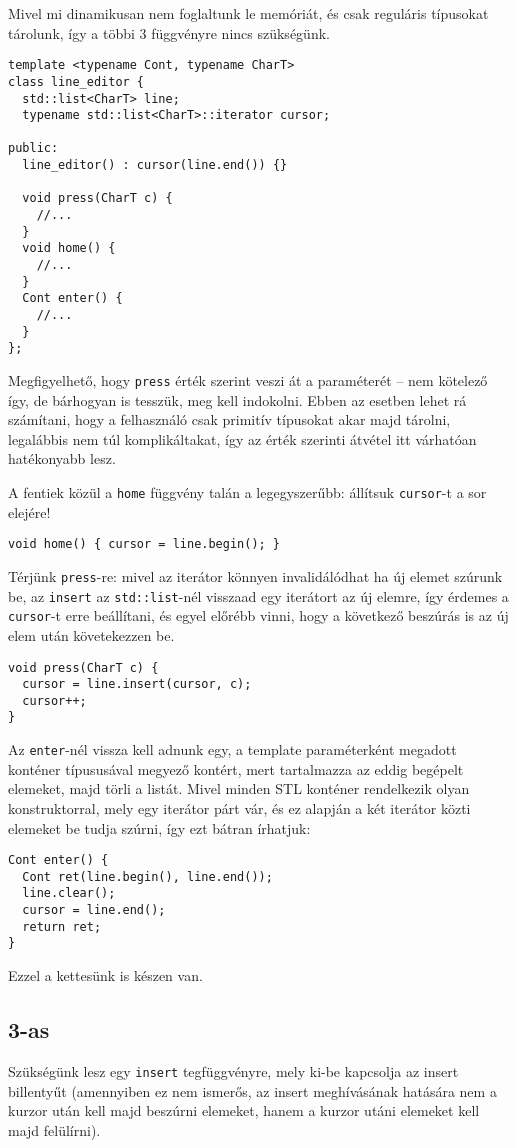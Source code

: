 \documentclass[../cpp_book/cpp_book.tex]{subfiles}
\begin{document}
	Mivel mi dinamikusan nem foglaltunk le memóriát, és csak reguláris típusokat tárolunk, így a többi 3 függvényre nincs szükségünk.
\begin{lstlisting}
template <typename Cont, typename CharT>
class line_editor {
  std::list<CharT> line;
  typename std::list<CharT>::iterator cursor;

public:
  line_editor() : cursor(line.end()) {}

  void press(CharT c) {
    //...
  }
  void home() {
    //...
  }
  Cont enter() {
    //...
  }
};
\end{lstlisting}
	\begin{note}
		Megfigyelhető, hogy \texttt{press} érték szerint veszi át a paraméterét -- nem kötelező így, de bárhogyan is tesszük, meg kell indokolni. Ebben az esetben lehet rá számítani, hogy a felhasználó csak primitív típusokat akar majd tárolni, legalábbis nem túl komplikáltakat, így az érték szerinti átvétel itt várhatóan hatékonyabb lesz.
	\end{note}
	A fentiek közül a \texttt{home} függvény talán a legegyszerűbb: állítsuk \texttt{cursor}-t a sor elejére!
	\begin{lstlisting}
void home() { cursor = line.begin(); }
	\end{lstlisting}
	Térjünk \texttt{press}-re: mivel az iterátor könnyen invalidálódhat ha új elemet szúrunk be, az \texttt{insert} az \texttt{std::list}-nél visszaad egy iterátort az új elemre, így érdemes a \texttt{cursor}-t erre beállítani, és egyel előrébb vinni, hogy a következő beszúrás is az új elem után követekezzen be.
	\begin{lstlisting}
void press(CharT c) {
  cursor = line.insert(cursor, c);
  cursor++;
}
	\end{lstlisting}
	Az \texttt{enter}-nél vissza kell adnunk egy, a template paraméterként megadott konténer típususával megyező kontért, mert tartalmazza az eddig begépelt elemeket, majd törli a listát. Mivel minden STL konténer rendelkezik olyan konstruktorral, mely egy iterátor párt vár, és ez alapján a két iterátor közti elemeket be tudja szúrni, így ezt bátran írhatjuk:
	\begin{lstlisting}
Cont enter() {
  Cont ret(line.begin(), line.end());
  line.clear();
  cursor = line.end();
  return ret;
}
	\end{lstlisting}
	Ezzel a kettesünk is készen van.
	\subsection{3-as}
	Szükségünk lesz egy \texttt{insert} tegfüggvényre, mely ki-be kapcsolja az insert billentyűt (amennyiben ez nem ismerős, az insert meghívásának hatására nem a kurzor után kell majd beszúrni elemeket, hanem a kurzor utáni elemeket kell majd felülírni).
	
\end{document}
